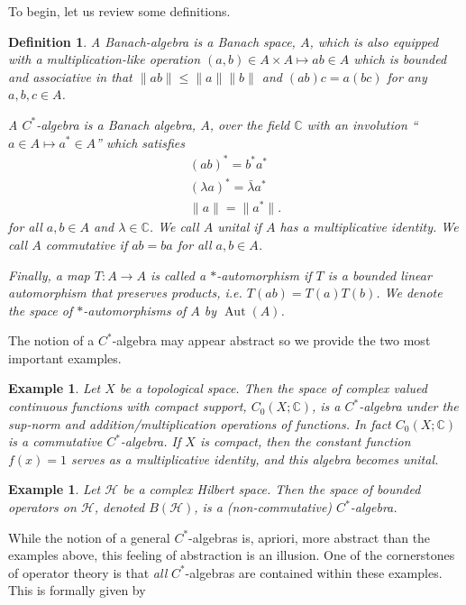 \documentclass[12pt]{amsart}
\newtheorem{defn}[thm]{Definition}
\newtheorem{example}[thm]{Example}
\begin{document}
To begin, let us review some definitions.
\begin{defn}
	A \emph{Banach-algebra} is a Banach space, $A$, which is also equipped with a multiplication-like operation $(a,b) \in A \times A \mapsto ab \in A$
	which is bounded and associative in that $\| ab \| \leq \|a \| \|b \|$ and $(ab)c = a(bc)$ for any $a,b,c \in A$.
	
	A \emph{$C^{*}$-algebra} is a Banach algebra, $A$, over the field $\mathbb{C}$ with an involution ``$a \in A \mapsto a^{*} \in A$'' which satisfies
	\begin{align}
		(ab)^{*} = b^{*} a^{*} \\
		(\lambda a)^{*} = \bar{\lambda} a^{*} \\
		\| a \| = \| a^{*}\|.
	\end{align}
	for all $a,b \in A$ and $\lambda \in \mathbb{C}$.
	We call $A$ \emph{unital} if $A$ has a multiplicative identity.
	We call $A$ commutative if $ab = ba$ for all $a,b \in A$.
	
	Finally, a map $T:A \to A$ is called a $*$-automorphism if $T$ is a bounded linear automorphism that preserves products, i.e. $T(ab) = T(a) T(b)$.
	We denote the space of $*$-automorphisms of $A$ by $\operatorname{Aut}(A)$.
\end{defn}

The notion of a $C^{*}$-algebra may appear abstract so we provide the two most important examples.

\begin{example}
	Let $X$ be a topological space.  Then the space of complex valued continuous functions with compact support, $C_{0}(X;\mathbb{C})$, is a $C^{*}$-algebra under the sup-norm and addition/multiplication operations of functions.
	In fact $C_{0}(X;\mathbb{C})$ is a commutative $C^{*}$-algebra.  If $X$ is compact, then the constant function $f(x) = 1$ serves as a multiplicative identity, and this algebra becomes unital.
\end{example}

\begin{example}
	Let $\mathcal{H}$ be a complex Hilbert space. Then the space of bounded operators on $\mathcal{H}$, denoted $B(\mathcal{H})$, is a (non-commutative) $C^{*}$-algebra.
\end{example}

While the notion of a general $C^{*}$-algebras is, apriori, more abstract than the examples above, this feeling of abstraction is an illusion.
One of the cornerstones of operator theory is that \emph{all} $C^{*}$-algebras are contained within these examples.
This is formally given by
\end{document}

